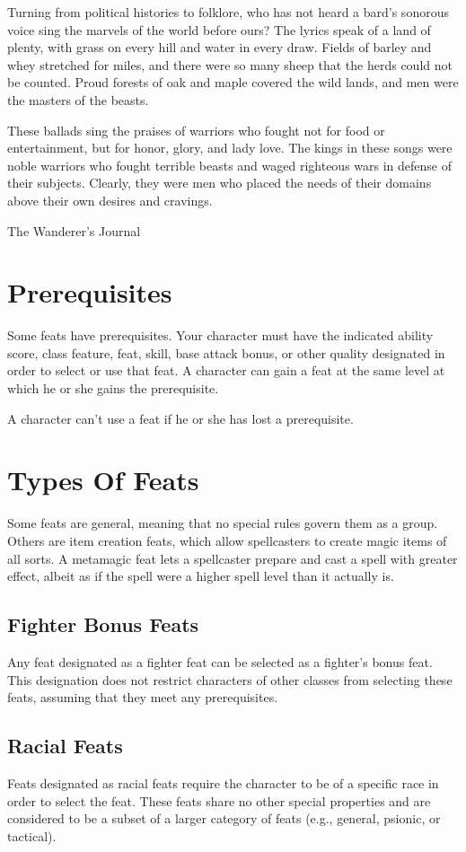 {Turning from political histories to folklore, who has not heard a bard's sonorous voice sing the marvels of the world before ours? The lyrics speak of a land of plenty, with grass on every hill and water in every draw. Fields of barley and whey stretched for miles, and there were so many sheep that the herds could not be counted. Proud forests of oak and maple covered the wild lands, and men were the masters of the beasts.

These ballads sing the praises of warriors who fought not for food or entertainment, but for honor, glory, and lady love. The kings in these songs were noble warriors who fought terrible beasts and waged righteous wars in defense of their subjects. Clearly, they were men who placed the needs of their domains above their own desires and cravings.}
{The Wanderer's Journal}

\section{Prerequisites}
Some feats have prerequisites. Your character must have the indicated ability score, class feature, feat, skill, base attack bonus, or other quality designated in order to select or use that feat. A character can gain a feat at the same level at which he or she gains the prerequisite.

A character can't use a feat if he or she has lost a prerequisite.

\section{Types Of Feats}
Some feats are general, meaning that no special rules govern them as a group. Others are item creation feats, which allow spellcasters to create magic items of all sorts. A metamagic feat lets a spellcaster prepare and cast a spell with greater effect, albeit as if the spell were a higher spell level than it actually is.

\subsection{Fighter Bonus Feats}
Any feat designated as a fighter feat can be selected as a fighter's bonus feat. This designation does not restrict characters of other classes from selecting these feats, assuming that they meet any prerequisites.

\subsection{Racial Feats}
Feats designated as racial feats require the character to be of a specific race in order to select the feat. These feats share no other special properties and are considered to be a subset of a larger category of feats (e.g., general, psionic, or tactical).

